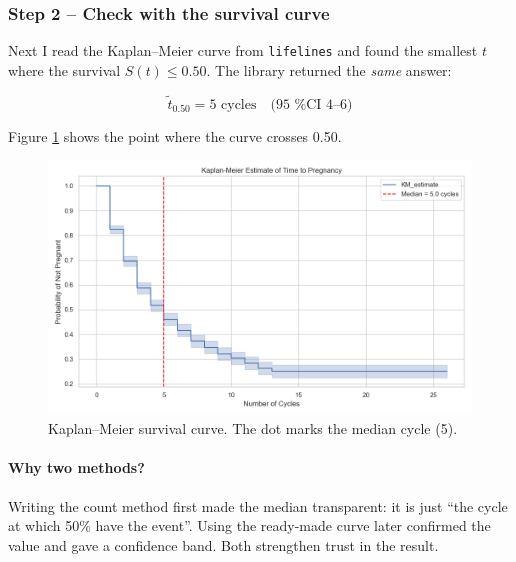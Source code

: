 \documentclass[11pt,a4paper]{article}
\begin{document}
\subsubsection{Step 2 – Check with the survival curve}
Next I read the Kaplan–Meier curve from \texttt{lifelines} and found the smallest
$t$ where the survival \(S(t)\le0.50\).
The library returned the \emph{same} answer:

\[
\tilde{t}_{0.50}=5 \text{ cycles} \quad\text{(95 \% CI 4–6)}
\]

Figure \ref{fig:km_median} shows the point where the curve crosses 0.50.

\begin{figure}[htbp]
  \centering
  \includegraphics[width=0.8\linewidth]{../results/Kaplan_meier_all.png}
  \caption{Kaplan–Meier survival curve.  The dot marks the median cycle (5).}
  \label{fig:km_median}
\end{figure}
\FloatBarrier

\paragraph{Why two methods?}
Writing the count method first made the median transparent:
it is just “the cycle at which 50\% have the event”.
Using the ready-made curve later confirmed the value and gave a confidence band.
Both strengthen trust in the result.



\end{document}
